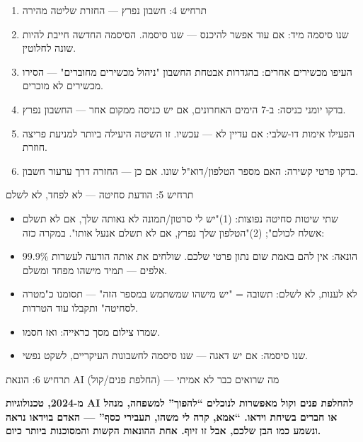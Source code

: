 
\begin{enumerate}
  \item תרחיש 4: חשבון נפרץ — החזרת שליטה מהירה
  \item שנו סיסמה מיד: אם עוד אפשר להיכנס — שנו סיסמה. הסיסמה החדשה חייבת להיות שונה לחלוטין.
  \item העיפו מכשירים אחרים: בהגדרות אבטחת החשבון "ניהול מכשירים מחוברים" — הסירו מכשירים לא מוכרים.
  \item בדקו יומני כניסה: ב-7 הימים האחרונים, אם יש כניסה ממקום אחר — החשבון נפרץ.
  \item הפעילו אימות דו-שלבי: אם עדיין לא — עכשיו. זו השיטה היעילה ביותר למניעת פריצה חוזרת.
  \item בדקו פרטי קשירה: האם מספר הטלפון/דוא"ל שונו. אם כן — החזרה דרך ערעור חשבון.
\end{enumerate}


תרחיש 5: הודעת סחיטה — לא לפחד, לא לשלם

\begin{itemize}
  \item שתי שיטות סחיטה נפוצות: (1)"יש לי סרטון/תמונה לא נאותה שלך, אם לא תשלם אשלח לכולם"; (2)"הטלפון שלך נפרץ, אם לא תשלם אנעל אותו". במקרה כזה:
  \item 99.9\% הונאה: אין להם באמת שום נתון פרטי שלכם. שולחים את אותה הודעה לעשרות אלפים — תמיד מישהו מפחד ומשלם.
  \item לא לענות, לא לשלם: תשובה = "יש מישהו שמשתמש במספר הזה" — תסומנו כ"מטרה לסחיטה" ותקבלו עוד הטרדות.
  \item שמרו צילום מסך כראייה: ואז חסמו.
  \item שנו סיסמה: אם יש דאגה — שנו סיסמה לחשבונות העיקריים, לשקט נפשי.
\end{itemize}


תרחיש 6: הונאת AI (החלפת פנים/קול) — מה שרואים כבר לא אמיתי

\textbf{מ-2024, טכנולוגיות AI להחלפת פנים וקול מאפשרות לנוכלים “להפוך” למשפחה, מנהל או חברים בשיחת וידאו. “אמא, קרה לי משהו, תעבירי כסף” — האדם בוידאו נראה ונשמע כמו הבן שלכם, אבל זו זיוף. אחת ההונאות הקשות והמסוכנות ביותר כיום.}\par

